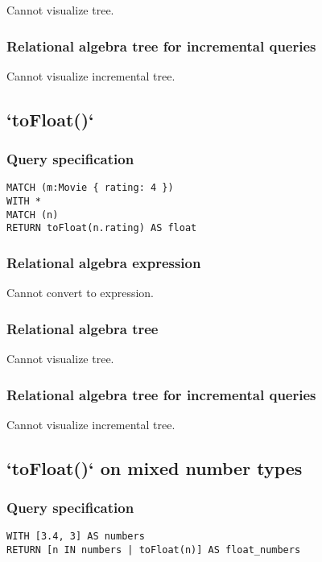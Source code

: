 Cannot visualize tree.

\subsubsection*{Relational algebra tree for incremental queries}

Cannot visualize incremental tree.

\subsection{`toFloat()`}

\subsubsection*{Query specification}

\begin{lstlisting}
MATCH (m:Movie { rating: 4 })
WITH *
MATCH (n)
RETURN toFloat(n.rating) AS float
\end{lstlisting}

\subsubsection*{Relational algebra expression}

Cannot convert to expression.

\subsubsection*{Relational algebra tree}

Cannot visualize tree.

\subsubsection*{Relational algebra tree for incremental queries}

Cannot visualize incremental tree.

\subsection{`toFloat()` on mixed number types}

\subsubsection*{Query specification}

\begin{lstlisting}
WITH [3.4, 3] AS numbers
RETURN [n IN numbers | toFloat(n)] AS float_numbers
\end{lstlisting}

